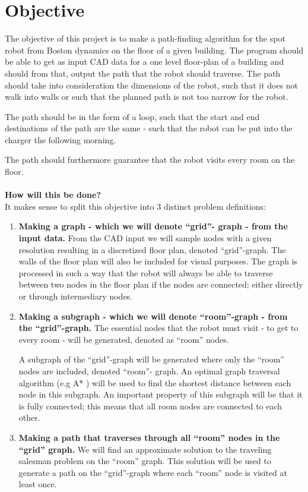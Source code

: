 \section{Objective}\label{Objective} 
The objective of this project is to make a path-finding algorithm for the spot robot from Boston dynamics on the floor of a given building. The program should be able to get as input CAD data for a one level floor-plan of a building and should from that, output the path that the robot should traverse. The path should take into consideration the dimensions of the robot, such that it does not walk into walls or such that the planned path is not too narrow for the robot.


The path should be in the form of a loop, such that the start and end destinations of the path are the same - such that the robot can be put into the charger the following morning.


The path should furthermore guarantee that the robot visits every room on the floor.
\\\\
\textbf{How will this be done?}
\\
It makes sense to split this objective into 3 distinct problem definitions:
\begin{enumerate}
    \item \textbf{Making a graph - which we will denote “grid”- graph - from the input data.} From the CAD input we will sample nodes with a given resolution resulting in a discretized floor plan, denoted “grid”-graph. The walls of the floor plan will also be included for visual purposes. The graph is processed in such a way that the robot will always be able to traverse between two nodes in the floor plan if the nodes are connected; either directly or through intermediary nodes.
    
    \item \textbf{Making a subgraph - which we will denote “room”-graph - from the “grid”-graph.}
    The essential nodes that the robot must visit - to get to every room - will be generated, denoted as “room” nodes.

    A subgraph of the “grid”-graph will be generated where only the “room” nodes are included, denoted “room”- graph.
    An optimal graph traversal algorithm (e.g A* ) will be used to find the shortest distance between each node in this subgraph. An important property of this subgraph will be that it is fully connected; this means that all room nodes are connected to each other.

    
    \item \textbf{Making a path that traverses through all “room” nodes in the “grid” graph.} We will find an approximate solution to the traveling salesman problem on the “room” graph. This solution will be used to generate a path on the “grid”-graph where each “room” node is visited at least once.
\end{enumerate}






